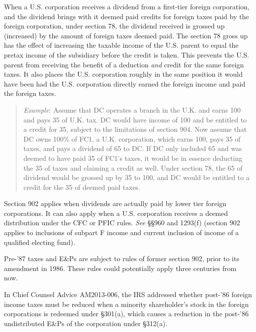 When a U.S. corporation receives a dividend from a first-tier foreign corporation, and the dividend brings with it deemed paid credits for foreign taxes paid by the foreign corporation, under section 78, the dividend received is grossed up (increased) by the amount of foreign taxes deemed paid.  The section 78 gross up has the effect of increasing the taxable income of the U.S. parent to equal the pretax income of the subsidiary before the credit is taken.  This prevents the U.S. parent from receiving the benefit of a deduction \emph{and} credit for the same foreign taxes.  It also places the U.S. corporation roughly in the same position it would have been had the U.S. corporation directly earned the foreign income and paid the foreign taxes.  

\begin{quote}
\emph{Example}:  Assume that DC operates a branch in the U.K. and earns 100 and pays 35 of U.K. tax.  DC would have income of 100 and be entitled to a credit for 35, subject to the limitations of section 904.  Now assume that DC owns 100\% of FC1, a U.K. corporation, which earns 100, pays 35 of taxes, and pays a dividend of 65 to DC.  If DC only included 65 and was deemed to have paid 35 of FC1's taxes, it would be in essence deducting the 35 of taxes and claiming a credit as well.  Under section 78, the 65 of dividend would be grossed up by 35 to 100, and DC would be entitled to a credit for the 35 of deemed paid taxes.
\end{quote}

Section 902 applies when dividends are actually paid by lower tier foreign corporations.  It can also apply when a U.S. corporation receives a deemed distribution under the CFC or PFIC rules.  \emph{See} \S\S960 and 1293(f) (section 902 applies to inclusions of subpart F income and current inclusion of income of a qualified electing fund). 

Pre-'87 taxes and E\&Ps are subject to rules of former section 902, prior to its amendment in 1986.  These rules could potentially apply three centuries from now.

In Chief Counsel Advice AM2013-006, the IRS addressed whether post-'86 foreign income taxes must be reduced when a minority shareholder's stock in the foreign corporations is redeemed under \S301(a), which causes a reduction in the post-'86 undistributed E\&Ps of the corporation under \S312(a).

